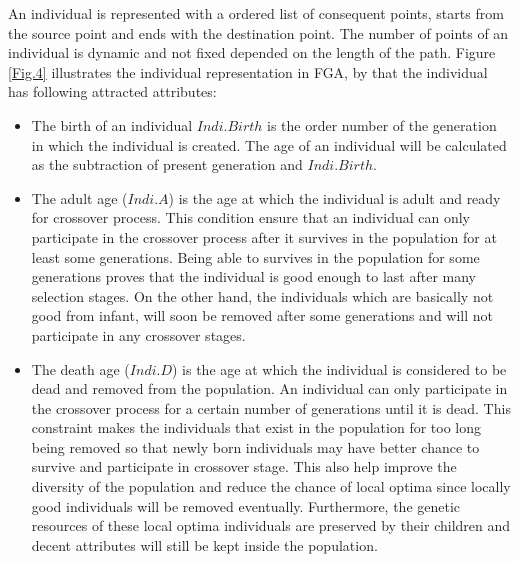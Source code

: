 \documentclass[final]{elsarticle}
\begin{document}
An individual is represented with a ordered list of consequent points, starts from the source point and ends with the destination point. The number of points of an individual is dynamic and not fixed depended on the length of the path. Figure \ref{Fig.4} illustrates the individual representation in FGA, by that the individual has following attracted attributes: \\
\begin{itemize}
	\item The birth of an individual $Indi.Birth$ is the order number of the generation in which the individual is created. The age of an individual will be calculated as the subtraction of present generation and $Indi.Birth$.
	\item The adult age ($Indi.A$) is the age at which the individual is adult and ready for crossover process. This condition ensure that an individual can only participate in the crossover process after it survives in the population for at least some generations. Being able to survives in the population for some generations proves that the individual is good enough to last after many selection stages. On the other hand, the individuals which are basically not good from infant, will soon be removed after some generations and will not participate in any crossover stages.
	\item The death age ($Indi.D$) is the age at which the individual is considered to be dead and removed from the population. An individual can only participate in the crossover process for a certain number of generations until it is dead. This constraint makes the individuals that exist in the population for too long being removed so that newly born individuals may have better chance to survive and participate in crossover stage. This also help improve the diversity of the population and reduce the chance of local optima since locally good individuals will be removed eventually. Furthermore, the genetic resources of these local optima individuals are preserved by their children and decent attributes will still be kept inside the population.
\end{itemize}
\end{document}
